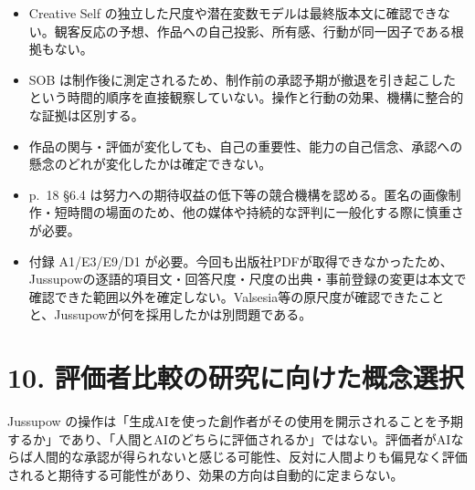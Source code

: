 \documentclass[
  11pt,
  a4paper,
]{article}
\providecommand{\tightlist}{%
  \setlength{\itemsep}{0pt}\setlength{\parskip}{0pt}}
\begin{document}
\begin{itemize}
\tightlist
\item
  Creative Self
  の独立した尺度や潜在変数モデルは最終版本文に確認できない。観客反応の予想、作品への自己投影、所有感、行動が同一因子である根拠もない。
\item
  SOB
  は制作後に測定されるため、制作前の承認予期が撤退を引き起こしたという時間的順序を直接観察していない。操作と行動の効果、機構に整合的な証拠は区別する。
\item
  作品の関与・評価が変化しても、自己の重要性、能力の自己信念、承認への懸念のどれが変化したかは確定できない。
\item
  p.~18 §6.4
  は努力への期待収益の低下等の競合機構を認める。匿名の画像制作・短時間の場面のため、他の媒体や持続的な評判に一般化する際に慎重さが必要。
\item
  付録 A1/E3/E9/D1
  が必要。今回も出版社PDFが取得できなかったため、Jussupowの逐語的項目文・回答尺度・尺度の出典・事前登録の変更は本文で確認できた範囲以外を確定しない。Valsesia等の原尺度が確認できたことと、Jussupowが何を採用したかは別問題である。
\end{itemize}

\section{10.
評価者比較の研究に向けた概念選択}\label{ux8a55ux4fa1ux8005ux6bd4ux8f03ux306eux7814ux7a76ux306bux5411ux3051ux305fux6982ux5ff5ux9078ux629e}

Jussupow
の操作は「生成AIを使った創作者がその使用を開示されることを予期するか」であり、「人間とAIのどちらに評価されるか」ではない。評価者がAIならば人間的な承認が得られないと感じる可能性、反対に人間よりも偏見なく評価されると期待する可能性があり、効果の方向は自動的に定まらない。
\end{document}
